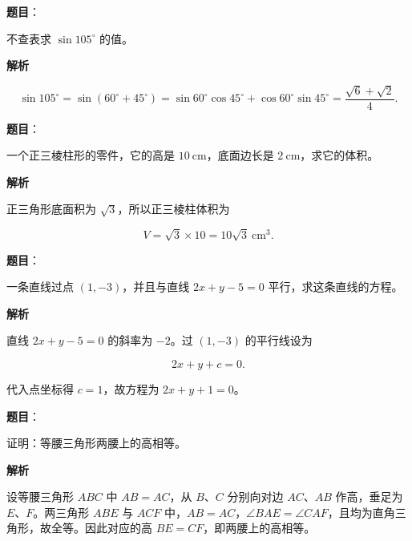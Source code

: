 \begin{answer}

\textbf{题目}：

不查表求 $\sin105^\circ$ 的值。

\textbf{解析}

\nopagebreak[4]
\[
\sin105^\circ=\sin(60^\circ+45^\circ)
=\sin60^\circ\cos45^\circ+\cos60^\circ\sin45^\circ
=\frac{\sqrt6+\sqrt2}{4}.
\]


\end{answer}
\begin{answer}

\textbf{题目}：

一个正三棱柱形的零件，它的高是 $10\ \mathrm{cm}$，底面边长是 $2\ \mathrm{cm}$，求它的体积。

\textbf{解析}

正三角形底面积为 $\sqrt3$，所以正三棱柱体积为

\nopagebreak[4]
\[
V=\sqrt3\times10=10\sqrt3\ \mathrm{cm^3}.
\]


\end{answer}
\begin{answer}

\textbf{题目}：

一条直线过点 $(1,-3)$，并且与直线 $2x+y-5=0$ 平行，求这条直线的方程。

\textbf{解析}

直线 $2x+y-5=0$ 的斜率为 $-2$。过 $(1,-3)$ 的平行线设为

\nopagebreak[4]
\[
2x+y+c=0.
\]

代入点坐标得 $c=1$，故方程为 $2x+y+1=0$。


\end{answer}
\begin{answer}

\textbf{题目}：

证明：等腰三角形两腰上的高相等。

\textbf{解析}

设等腰三角形 $ABC$ 中 $AB=AC$，从 $B\text{、}C$ 分别向对边 $AC\text{、}AB$ 作高，垂足为 $E\text{、}F$。两三角形 $ABE$ 与 $ACF$ 中，$AB=AC$，$\angle BAE=\angle CAF$，且均为直角三角形，故全等。因此对应的高 $BE=CF$，即两腰上的高相等。


\end{answer}
